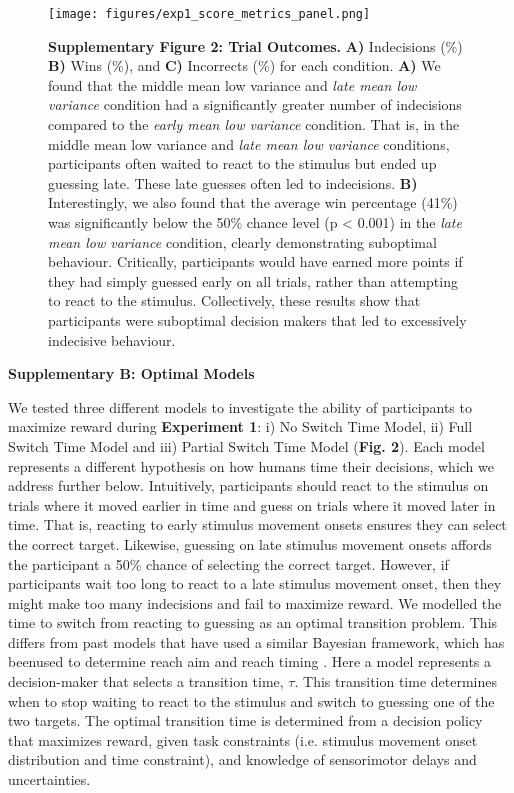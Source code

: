 \documentclass[12pt]{article}
\newcommand\boldblue[1]{\textcolor{mydarkblue}{\textbf{#1}}}
\begin{document}
\begin{figure}[H]
    \centering
    \texttt{[image: figures/exp1\_score\_metrics\_panel.png]}

    \caption*{\boldblue{Supplementary Figure 2: Trial Outcomes.} \boldblue{A)} Indecisions (\%) \boldblue{B)} Wins (\%), and \boldblue{C)} Incorrects (\%) for each condition. \boldblue{A)} We found that the middle mean low variance and \emph{late mean low variance} condition had a significantly greater number of indecisions compared to the \emph{early mean low variance} condition. That is, in the middle mean low variance and \emph{late mean low variance} conditions, participants often waited to react to the stimulus but ended up guessing late. These late guesses often led to indecisions. \boldblue{B)} Interestingly, we also found that the average win percentage (41\%) was significantly below the 50\% chance level (p < 0.001) in the \emph{late mean low variance} condition, clearly demonstrating suboptimal behaviour. Critically, participants would have earned more points if they had simply guessed early on all trials, rather than attempting to react to the stimulus. Collectively, these results show that participants were suboptimal decision makers that led to excessively indecisive behaviour.}
\end{figure}

\newpage
\noindent\boldblue{\large{Supplementary B: Optimal Models}}

We tested three different models to investigate the ability of participants to maximize reward during \boldblue{Experiment 1}: i) No Switch Time Model, ii) Full Switch Time Model and iii) Partial Switch Time Model (\boldblue{Fig. 2}). Each model represents a different hypothesis on how humans time their decisions, which we address further below. Intuitively, participants should react to the stimulus on trials where it moved earlier in time and guess on trials where it moved later in time. That is, reacting to early stimulus movement onsets ensures they can select the correct target. Likewise, guessing on late stimulus movement onsets affords the participant a 50\% chance of selecting the correct target. However, if participants wait too long to react to a late stimulus movement onset, then they might make too many indecisions and fail to maximize reward.
We modelled the time to switch from reacting to guessing as an optimal transition problem. This differs from past models that have used a similar Bayesian framework, which has beenused to determine reach aim \autocite{trommershauserStatisticalDecisionTheory2003} and reach timing \autocite{hudsonOptimalCompensationTemporal2008}. Here a model represents a decision-maker that selects a transition time, $\tau$. This transition time determines when to stop waiting to react to the stimulus and switch to guessing one of the two targets. The optimal transition time is determined from a decision policy that maximizes reward, given task constraints (i.e. stimulus movement onset distribution and time constraint), and knowledge of sensorimotor delays and uncertainties.
\end{document}
